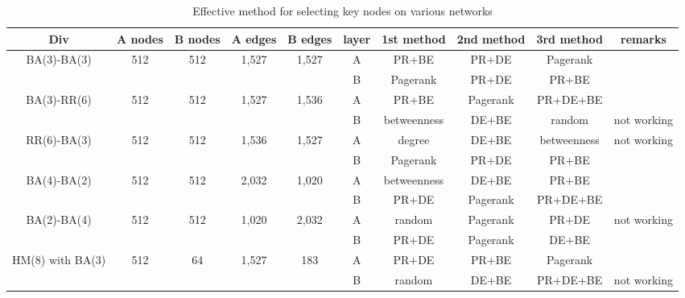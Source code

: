 \begin{table}[!htb]
	\scriptsize
	\centering
	\caption{Effective method for selecting key nodes on various networks}
	\label{effective methods}
	\begin{center}
		\begin{tabular}{c|c|c|c|c|c|c|c|c|c} \hline\hline
		  Div                              & A nodes & B nodes & A edges & B edges & layer & 1st method & 2nd method  & 3rd method  & remarks    \\ \hline \hline
         \multirow{1}{*}{BA(3)-BA(3)}      & 512 	 & 512     & 1,527   & 1,527   & A     & PR+BE      & PR+DE       & Pagerank    &            \\ 
			                               &  	     &         &         &         & B     & Pagerank   & PR+DE       & PR+BE       &		     \\ \hline   
	     \multirow{1}{*}{BA(3)-RR(6)}      & 512     & 512     & 1,527   & 1,536   & A     & PR+BE      & Pagerank    & PR+DE+BE    &            \\
	                                       &         &         &         &         & B     & betweenness& DE+BE       & random      & not working\\ \hline
	     \multirow{1}{*}{RR(6)-BA(3)}      & 512     & 512     & 1,536   & 1,527   & A     & degree     & DE+BE       & betweenness & not working\\ 
	                                       &         &         &         &         & B     & Pagerank   & PR+DE       & PR+BE       &            \\ \hline
		 \multirow{1}{*}{BA(4)-BA(2)}      & 512     & 512     & 2,032   & 1,020   & A     & betweenness& DE+BE       & PR+BE       &            \\ 
		                                   &         &         &         &         & B     & PR+DE      & Pagerank    & PR+DE+BE    &            \\ \hline
		 \multirow{1}{*}{BA(2)-BA(4)}      & 512     & 512     & 1,020   & 2,032   & A     & random     & Pagerank    & PR+DE       & not working\\ 
		                                   &         &         &         &         & B     & PR+DE      & Pagerank    & DE+BE       &            \\ \hline
		 \multirow{1}{*}{HM(8) with BA(3)} & 512     & 64      & 1,527   & 183     & A     & PR+DE      & PR+BE       & Pagerank    &            \\ 
		                                   &         &         &         &         & B     & random     & DE+BE       & PR+DE+BE    & not working\\ \hline
			\hline
		\end{tabular}
	\end{center}
\end{table}


